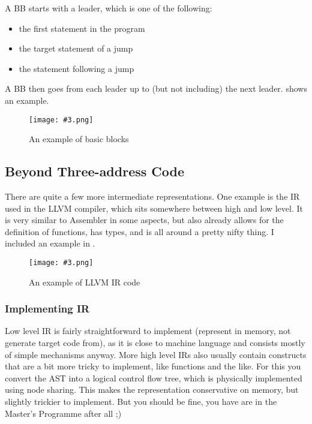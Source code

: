 \documentclass{article}
\newcommand{\fig}[4]{
	\begin{figure}[#1]
		\center
		\texttt{[image: \#3.png]}
		\caption{#4}
		\label{fig:#3}
	\end{figure}
	}
\begin{document}
A BB starts with a leader, which is one of the following:
\begin{itemize}
	\item the first statement in the program
	\item the target statement of a jump
	\item the statement following a jump
\end{itemize}
A BB then goes from each leader up to (but not including) the next leader.
 shows an example.

\fig{h}{}{bbs}{An example of basic blocks}

\subsection{Beyond Three-address Code}
There are quite a few more intermediate representations.
One example is the IR used in the LLVM compiler, which sits somewhere between high and low level.
It is very similar to Assembler in some aspects, but also already allows for the definition of functions, has types, and is all around a pretty nifty thing.
I included an example in .

\fig{h}{}{llvm}{An example of LLVM IR code}

\subsubsection{Implementing IR}
Low level IR is fairly straightforward to implement (represent in memory, not generate target code from), as it is close to machine language and consists mostly of simple mechanisms anyway.
More high level IRs also usually contain constructs that are a bit more tricky to implement, like functions and the like.
For this you convert the AST into a logical control flow tree, which is physically implemented using node sharing.
This makes the representation conservative on memory, but slightly trickier to implement.
But you should be fine, you have are in the Master's Programme after all ;)
\end{document}
